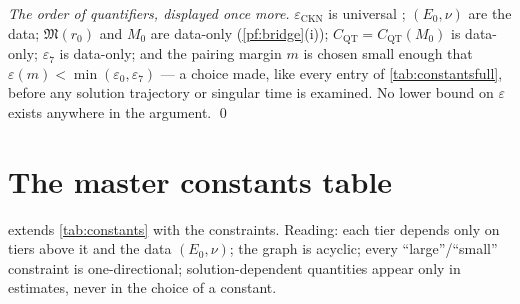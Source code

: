 \documentclass[11pt,letterpaper]{amsart}
\theoremstyle{definition}
\theoremstyle{remark}
\begin{document}
\emph{The order of quantifiers, displayed once more.}
$\varepsilon_{\mathrm{CKN}}$ is universal \cite{CKN1982,Lin1998}; $(E_0,\nu)$ are the
data; $\mathfrak{M}(r_0)$ and $M_0$ are data-only (\cref{pf:bridge}(i));
$C_{\mathrm{QT}}=C_{\mathrm{QT}}(M_0)$ is data-only; $\varepsilon_7$ is data-only;
and the pairing margin $m$ is chosen small enough that
$\varepsilon(m)<\min(\varepsilon_0,\varepsilon_7)$ --- a choice made, like every
entry of \cref{tab:constantsfull}, before any solution trajectory or singular time
is examined. No lower bound on $\varepsilon$ exists anywhere in the argument. \qed


\appendix

\section{The master constants table}\label{app:constants}

 extends \cref{tab:constants} with the constraints. Reading:
each tier depends only on tiers above it and the data $(E_0,\nu)$; the graph is
acyclic; every ``large''/``small'' constraint is one-directional; solution-dependent
quantities appear only in estimates, never in the choice of a constant.
\end{document}
